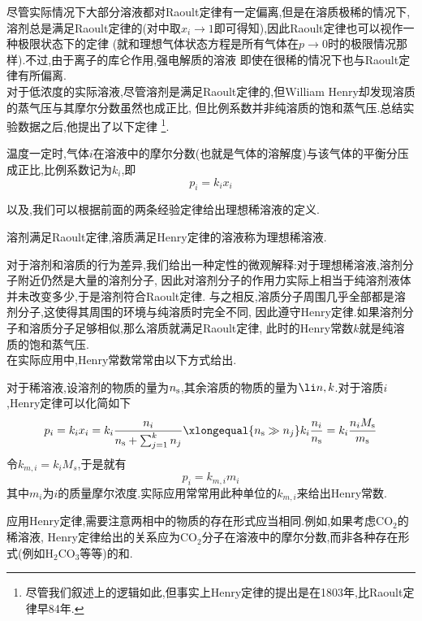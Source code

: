 \documentclass{ctexart}
\begin{document}
\indent 尽管实际情况下大部分溶液都对Raoult定律有一定偏离,但是在溶质极稀的情况下,%
溶剂总是满足Raoult定律的(对中取$x_i\to1$即可得知),因此Raoult定律也可以视作一种极限状态下的定律%
(就和理想气体状态方程是所有气体在$p\to0$时的极限情况那样).不过,由于离子的库仑作用,强电解质的溶液%
即使在很稀的情况下也与Raoult定律有所偏离.\vspace{4pt}\\
\indent 对于低浓度的实际溶液,尽管溶剂是满足Raoult定律的,但William Henry却发现溶质的蒸气压与其摩尔分数虽然也成正比,%
但比例系数并非纯溶质的饱和蒸气压.总结实验数据之后,他提出了以下定律%
\footnote{尽管我们叙述上的逻辑如此,但事实上Henry定律的提出是在1803年,比Raoult定律早84年.}.
\begin{theorem}[4C.1.3 Henry定律]
    温度一定时,气体$i$在溶液中的摩尔分数(也就是气体的溶解度)与该气体的平衡分压成正比,比例系数记为$k_i$,即
    \[p_i=k_ix_i\]

\end{theorem}
以及,我们可以根据前面的两条经验定律给出理想稀溶液的定义.
\begin{definition}[4C.1.4 理想稀溶液]
    溶剂满足Raoult定律,溶质满足Henry定律的溶液称为理想稀溶液.
\end{definition}
对于溶剂和溶质的行为差异,我们给出一种定性的微观解释:对于理想稀溶液,溶剂分子附近仍然是大量的溶剂分子,%
因此对溶剂分子的作用力实际上相当于纯溶剂液体并未改变多少,于是溶剂符合Raoult定律.%
与之相反,溶质分子周围几乎全部都是溶剂分子,这使得其周围的环境与纯溶质时完全不同,%
因此遵守Henry定律.如果溶剂分子和溶质分子足够相似,那么溶质就满足Raoult定律,%
此时的Henry常数$k$就是纯溶质的饱和蒸气压.\\
\indent 在实际应用中,Henry常数常常由以下方式给出.
\begin{derivation}
    对于稀溶液,设溶剂的物质的量为$n_\text s$\footnotemark,其余溶质的物质的量为$\li n,k$.对于溶质$i$,Henry定律可以化简如下
    \[p_i=k_ix_i=k_i\dfrac{n_i}{n_\text s+\sum_{j=1}^k n_j}\xlongequal{n_\text s\gg n_j}
    k_i\dfrac{n_i}{n_\text s}=k_i\dfrac{n_iM_\text s}{m_\text s}\]
    令$k_{m,i}=k_iM_s$,于是就有
    \[p_i=k_{m,i}m_i\]
    其中$m_i$为$i$的质量摩尔浓度.实际应用常常用此种单位的$k_{m,i}$来给出Henry常数.
\end{derivation}
应用Henry定律,需要注意两相中的物质的存在形式应当相同.例如,如果考虑$\text{CO}_2$的稀溶液,%
Henry定律给出的关系应为$\text{CO}_2$分子在溶液中的摩尔分数,而非各种存在形式(例如$\text{H}_2\text{CO}_3$等等)的和.\vspace{4pt}\\
\end{document}

